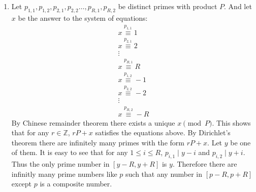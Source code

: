 \begin{enumerate}[label=]
    \item 
        Let $p_{1, 1}, p_{1, 2}, p_{2, 1}, p_{2, 2} \dots, p_{R, 1}, p_{R, 2}$ be distinct primes with product $P$.
        And let $x$ be the answer to the system of equations:
        \begin{gather*}
            x \overset{p_{1, 1}}{\equiv} 1 \\
            x \overset{p_{2, 1}}{\equiv} 2 \\
            \vdots \\
            x \overset{p_{R, 1}}{\equiv} R \\
            x \overset{p_{1, 2}}{\equiv} -1\\
            x \overset{p_{2, 2}}{\equiv} -2 \\
            \vdots \\
            x \overset{p_{R, 2}}{\equiv} -R
        \end{gather*} 
        By Chinese remainder theorem there exists a unique $x \pmod P$. This shows that for any $r \in \mathbb Z$, $rP + x$ satisfies the equations above.
        By Dirichlet's theorem there are infinitely many primes with the form $rP + x$. Let $y$ be one of them.
        It is easy to see that for any $1 \le i \le R$, $p_{i, 1}\mid y - i $ and $p_{i, 2} \mid y + i$. Thus the only prime number in $[y - R, y + R]$ is $y$.
        Therefore there are infinitly many prime numbers like $p$ such that any number in $[p - R, p + R]$ except $p$ is a composite number.
\end{enumerate}